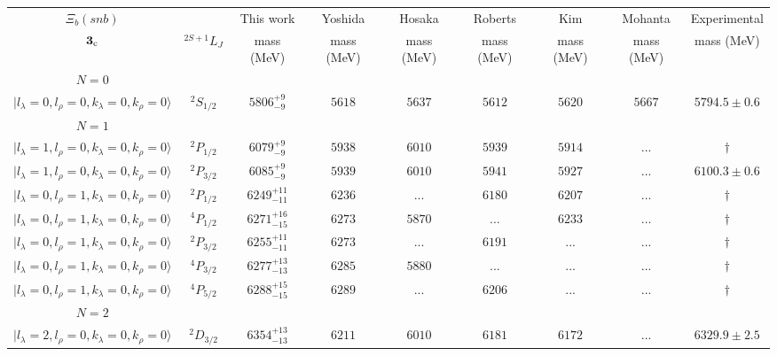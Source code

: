 \begin{tabular}{c c| c c c c c c c}\hline \hline
$\Xi_{b}(snb)$&                  & This work   &   Yoshida     &  Hosaka      &  Roberts    & Kim        & Mohanta    & Experimental  \\ 
${\bf {3}}_{\rm c}$  & $^{2S+1}L_{J}$ & mass (MeV)  &   mass (MeV)  &  mass (MeV)  &  mass (MeV) & mass (MeV) & mass (MeV) &      mass (MeV) \\ \hline
\hline
 $N=0$  &  &  &  &  &  \\ 
$\vert l_{\lambda}\!\!=\!0, l_{\rho}\!\!=\!0, k_{\lambda}\!\!=\!0, k_{\rho}\!\!=\!0 \rangle$ & $^{2}S_{1/2}$ & $5806^{+9}_{-9}$ & $5618$ & $5637$ & $5612$ & $5620$ & $5667$ & $5794.5\pm 0.6$ \\ 
\hline
 $N=1$  &  &  &  &  &  \\ 
$\vert l_{\lambda}\!\!=\!1, l_{\rho}\!\!=\!0, k_{\lambda}\!\!=\!0, k_{\rho}\!\!=\!0 \rangle$ & $^{2}P_{1/2}$ & $6079^{+9}_{-9}$ & $5938$ & $6010$ & $5939$ & $5914$ & ... & $\dagger$ \\ 
$\vert l_{\lambda}\!\!=\!1, l_{\rho}\!\!=\!0, k_{\lambda}\!\!=\!0, k_{\rho}\!\!=\!0 \rangle$ & $^{2}P_{3/2}$ & $6085^{+9}_{-9}$ & $5939$ & $6010$ & $5941$ & $5927$ & ... & $6100.3\pm 0.6$ \\ 
$\vert l_{\lambda}\!\!=\!0, l_{\rho}\!\!=\!1, k_{\lambda}\!\!=\!0, k_{\rho}\!\!=\!0 \rangle$ & $^{2}P_{1/2}$ & $6249^{+11}_{-11}$ & $6236$ & ... & $6180$ & $6207$ & ... & $\dagger$ \\ 
$\vert l_{\lambda}\!\!=\!0, l_{\rho}\!\!=\!1, k_{\lambda}\!\!=\!0, k_{\rho}\!\!=\!0 \rangle$ & $^{4}P_{1/2}$ & $6271^{+16}_{-15}$ & $6273$ & $5870$ & ... & $6233$ & ... & $\dagger$ \\ 
$\vert l_{\lambda}\!\!=\!0, l_{\rho}\!\!=\!1, k_{\lambda}\!\!=\!0, k_{\rho}\!\!=\!0 \rangle$ & $^{2}P_{3/2}$ & $6255^{+11}_{-11}$ & $6273$ & ... & $6191$ & ... & ... & $\dagger$ \\ 
$\vert l_{\lambda}\!\!=\!0, l_{\rho}\!\!=\!1, k_{\lambda}\!\!=\!0, k_{\rho}\!\!=\!0 \rangle$ & $^{4}P_{3/2}$ & $6277^{+13}_{-13}$ & $6285$ & $5880$ & ... & ... & ... & $\dagger$ \\ 
$\vert l_{\lambda}\!\!=\!0, l_{\rho}\!\!=\!1, k_{\lambda}\!\!=\!0, k_{\rho}\!\!=\!0 \rangle$ & $^{4}P_{5/2}$ & $6288^{+15}_{-15}$ & $6289$ & ... & $6206$ & ... & ... & $\dagger$ \\ 
\hline
 $N=2$  &  &  &  &  &  \\ 
$\vert l_{\lambda}\!\!=\!2, l_{\rho}\!\!=\!0, k_{\lambda}\!\!=\!0, k_{\rho}\!\!=\!0 \rangle$ & $^{2}D_{3/2}$ & $6354^{+13}_{-13}$ & $6211$ & $6010$ & $6181$ & $6172$ & ... & $6329.9\pm 2.5$ \\ 

\end{tabular}
